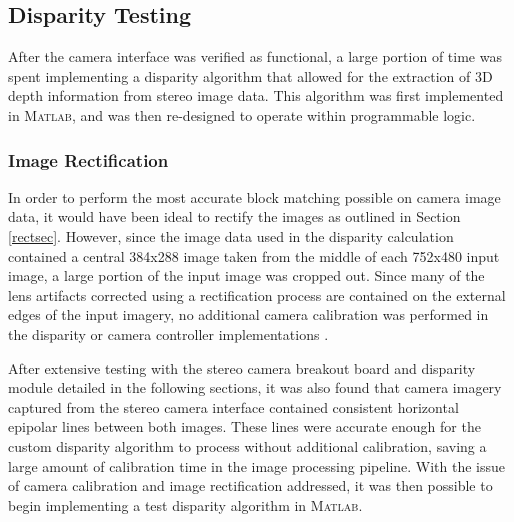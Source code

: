 \subsection{Disparity Testing}
After the camera interface was verified as functional, a large portion of time was spent implementing a disparity algorithm that allowed for the extraction of 3D depth information from stereo image data. This algorithm was first implemented in \textsc{Matlab}, and was then re-designed to operate within programmable logic. 

\subsubsection{Image Rectification}
In order to perform the most accurate block matching possible on camera image data, it would have been ideal to rectify the images as outlined in Section \ref{rectsec}. However, since the image data used in the disparity calculation contained a central 384x288 image taken from the middle of each 752x480 input image, a large portion of the input image was cropped out. Since many of the lens artifacts corrected using a rectification process are contained on the external edges of the input imagery, no additional camera calibration was performed in the disparity or camera controller implementations \cite{collins}. 
\par
After extensive testing with the stereo camera breakout board and disparity module detailed in the following sections, it was also found that camera imagery captured from the stereo camera interface contained consistent horizontal epipolar lines between both images. These lines were accurate enough for the custom disparity algorithm to process without additional calibration, saving a large amount of calibration time in the image processing pipeline. With the issue of camera calibration and image rectification addressed, it was then possible to begin implementing a test disparity algorithm in \textsc{Matlab}.

